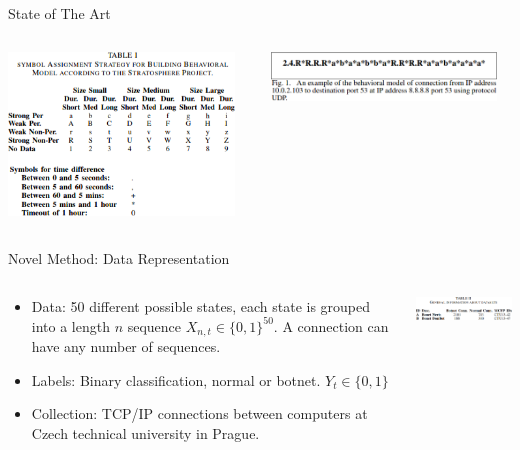 \documentclass[pdf]{beamer}
\begin{document}
\begin{frame}[fragile]{State of The Art}
\begin{minipage}[0.2\textheight]{\textwidth}
\begin{columns}[T]
\begin{column}{0.5\textwidth}
\includegraphics[width=6cm]{Images/behavior.png}
\end{column}
\begin{column}{0.5\textwidth}
\vspace{2cm}
\includegraphics[width=6cm]{Images/example.png}
\end{column}
\end{columns}
\end{minipage}
\end{frame}


\begin{frame}[fragile]{Novel Method: Data Representation}
\begin{minipage}[0.2\textheight]{\textwidth}
\begin{columns}[T]
\begin{column}{0.5\textwidth}
\begin{itemize}
\item Data: 50 different possible states, each state is grouped into a length $n$ sequence $X_{n,t} \in \{ 0, 1 \}^{50}$. A connection can have any number of sequences.
\item Labels: Binary classification, normal or botnet. $Y_t \in \{ 0,1 \}$
\item Collection: TCP/IP connections between computers at Czech technical university in Prague.
\end{itemize}
\end{column}
\begin{column}{0.5\textwidth}
\vspace{1cm}
\includegraphics[width=6cm]{Images/table2.png}
\end{column}
\end{columns}
\end{minipage}
\end{frame}
\end{document}
